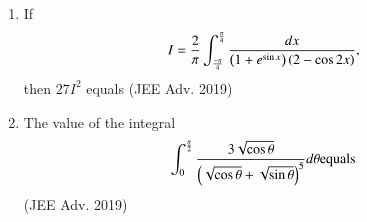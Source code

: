 \documentclass[journal,12pt,onecolumn]{IEEEtran}
\theoremstyle{remark}
\begin{document}
\begin{enumerate}
\item If  \begin{align} I=\frac{2}{\pi} \int_{\frac{-\pi}{4}}^{\frac{\pi}{4}} \frac{dx}{\left(1+e^{\sin x}\right)\left(2-\cos2x\right)},\end{align} then $27I^2$ equals \hfill{(JEE Adv. 2019)}

\item The value of the integral 
	\begin{align} \int_{0}^{\frac{\pi}{2}} \frac{3\sqrt{\cos\theta}}{\left(\sqrt{\cos\theta}+\sqrt{\sin\theta}\right)^5} d\theta \text{equals} \end{align} \hfill{(JEE Adv. 2019)}
\end{enumerate}
\end{document}
